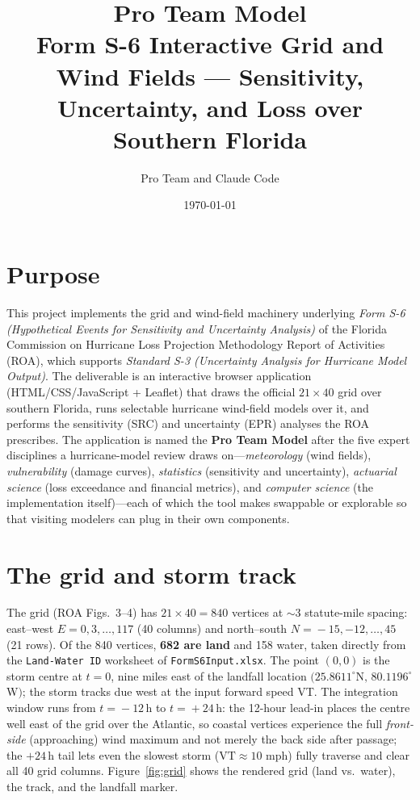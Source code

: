 \documentclass[11pt]{article}
\title{\textbf{Pro Team Model}\\[2pt]
\large Form S-6 Interactive Grid and Wind Fields ---
Sensitivity, Uncertainty, and Loss over Southern Florida}
\author{Pro Team and Claude Code}
\date{\today}
\begin{document}
\maketitle

\section{Purpose}
This project implements the grid and wind-field machinery underlying
\emph{Form S-6 (Hypothetical Events for Sensitivity and Uncertainty Analysis)} of
the Florida Commission on Hurricane Loss Projection Methodology Report of
Activities (ROA), which supports \emph{Standard S-3 (Uncertainty Analysis for
Hurricane Model Output)}. The deliverable is an interactive browser application
(HTML/CSS/JavaScript + Leaflet) that draws the official $21\times40$ grid over
southern Florida, runs selectable hurricane wind-field models over it, and
performs the sensitivity (SRC) and uncertainty (EPR) analyses the ROA prescribes.
The application is named the \textbf{Pro Team Model} after the five expert
disciplines a hurricane-model review draws on---\emph{meteorology} (wind fields),
\emph{vulnerability} (damage curves), \emph{statistics} (sensitivity and
uncertainty), \emph{actuarial science} (loss exceedance and financial metrics), and
\emph{computer science} (the implementation itself)---each of which the tool makes
swappable or explorable so that visiting modelers can plug in their own components.

\section{The grid and storm track}
The grid (ROA Figs.~3--4) has $21\times40=840$ vertices at $\sim$3 statute-mile
spacing: east--west $E\!=\!0,3,\dots,117$ (40 columns) and north--south
$N\!=\!-15,-12,\dots,45$ (21 rows). Of the 840 vertices, \textbf{682 are land}
and 158 water, taken directly from the \texttt{Land-Water ID} worksheet of
\texttt{FormS6Input.xlsx}. The point $(0,0)$ is the storm centre at $t\!=\!0$,
nine miles east of the landfall location $(25.8611^\circ$N$,\,80.1196^\circ$W$)$;
the storm tracks due west at the input forward speed VT. The integration window
runs from $t\!=\!-12$\,h to $t\!=\!+24$\,h: the 12-hour lead-in places the centre
well east of the grid over the Atlantic, so coastal vertices experience the full
\emph{front-side} (approaching) wind maximum and not merely the back side after
passage; the $+24$\,h tail lets even the slowest storm ($\text{VT}\!\approx\!10$
mph) fully traverse and clear all 40 grid columns. Figure~\ref{fig:grid}
shows the rendered grid (land vs.\ water), the track, and the landfall marker.
\end{document}

